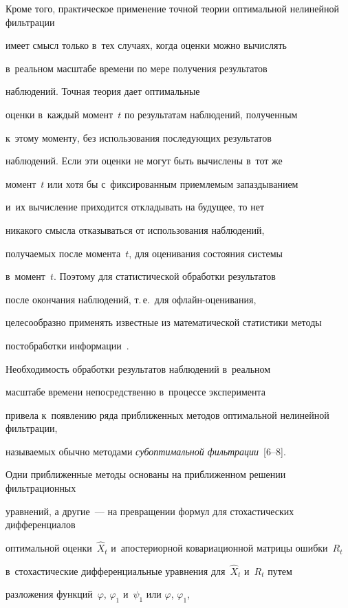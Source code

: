  Кроме того, практическое применение точной теории оптимальной нелинейной фильтрации

 имеет смысл только в~тех случаях, когда оценки можно вычислять 

 в~реальном масштабе времени по мере получения результатов

 наблюдений. Точная теория дает оптимальные

 оценки в~каждый момент~$t$ по результатам наблюдений, полученным

 к~этому моменту, без использования последующих результатов

 наблюдений. Если эти оценки не могут быть вычислены в~тот же

 момент~$t$ или хотя бы с~фиксированным приемлемым запаздыванием

 и~их вычисление приходится откладывать на будущее, то нет

 никакого смыс\-ла отказываться от использования наблюдений,

 получаемых после момента~$t$, для оценивания состояния системы 

 в~момент~$t$. Поэтому для статистической обработки результатов

 после окончания наблюдений, т.\,е.\ для оф\-лайн-оце\-ни\-ва\-ния,

 целесообразно применять известные из математической статистики методы

 постобработки информации~\cite{6-s1}.



 Необходимость обработки результатов наблюдений в~реальном

 масштабе времени непосредственно в~процессе эксперимента

 привела  к~появлению ряда приближенных методов оптимальной нелинейной  фильтрации,

 называемых обычно методами \textit{субоптимальной фильтрации}~[6--8]. %

 Одни  приближенные методы основаны на  приближенном решении фильтрационных

 уравнений, а другие~---  на превращении формул  для стохастических дифференциалов 

 оптимальной  оценки~$\hat X_t$ и~апостериорной ковариационной  матрицы ошибки~$R_t$ 

 в~стохастические дифференциальные уравнения  для~$\hat X_t$ и~$R_t$ путем 

 разложения функций~$\varphi$, $\varphi_1$ и~$\psi_1$ или $\varphi$, $\varphi_1$, 


